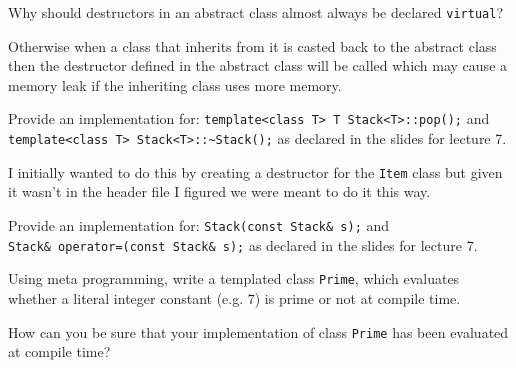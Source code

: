 \documentclass{supervision}
\begin{document}
\begin{questions}
    \question
    Why should destructors in an abstract class almost always be declared \lstinline|virtual|?
    \begin{solution}
        Otherwise when a class that inherits from it is casted back to the abstract class then the destructor defined in the abstract class will be called which may cause a memory leak if the inheriting class uses more memory.
    \end{solution}

    \question
    Provide an implementation for: \lstinline|template<class T> T Stack<T>::pop();| and \lstinline|template<class T> Stack<T>::~Stack();| as declared in the slides for lecture 7.
    \begin{solution}
        I initially wanted to do this by creating a destructor for the \lstinline|Item| class but given it wasn't in the header file I figured we were meant to do it this way.
    \end{solution}

    \question
    Provide an implementation for: \lstinline|Stack(const Stack& s);| and \\ \lstinline|Stack& operator=(const Stack& s);| as declared in the slides for lecture 7.
    \begin{solution}

    \end{solution}

    \question
    Using meta programming, write a templated class \lstinline|Prime|, which evaluates whether a literal integer constant (e.g. $7$) is prime or not at compile time.

    \question
    How can you be sure that your implementation of class \lstinline|Prime| has been evaluated at compile time?


\end{questions}
\end{document}
